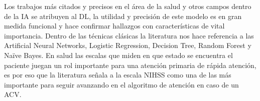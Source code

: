 \par Los trabajos más citados y precisos en el área de la salud y otros campos dentro de la IA se atribuyen al DL, la utilidad y precisión de este modelo es en gran medida funcional y hace confirmar hallazgos con características de vital importancia. Dentro de las técnicas clásicas la literatura nos hace referencia a las Artificial Neural Networks, Logistic Regression, Decision Tree, Random Forest y Naïve Bayes.
En salud las escalas que miden en que estado se encuentra el paciente juegan un rol importante para una atención primaria de rápida atención, es por eso que la literatura señala a la escala NIHSS como una de las más importante para seguir avanzando en el algoritmo de atención en caso de un ACV.\\

